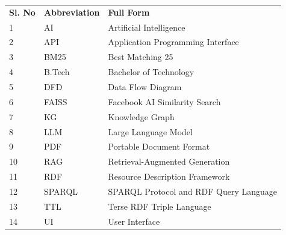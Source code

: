 \renewcommand{\arraystretch}{2.0}
\begin{tabularx}{\textwidth}{p{2cm} p{3cm} X}
\textbf{Sl. No} & \textbf{Abbreviation} & \textbf{Full Form} \\[5pt]

1 & AI & Artificial Intelligence \\[5pt]
2 & API & Application Programming Interface \\[5pt]
3 & BM25 & Best Matching 25 \\[5pt]
4 & B.Tech & Bachelor of Technology \\[5pt]
5 & DFD & Data Flow Diagram \\[5pt]
6 & FAISS & Facebook AI Similarity Search \\[5pt]
7 & KG & Knowledge Graph \\[5pt]
8 & LLM & Large Language Model \\[5pt]
9 & PDF & Portable Document Format \\[5pt]
10 & RAG & Retrieval-Augmented Generation \\[5pt]
11 & RDF & Resource Description Framework \\[5pt]
12 & SPARQL & SPARQL Protocol and RDF Query Language \\[5pt]
13 & TTL & Terse RDF Triple Language \\[5pt]
14 & UI & User Interface \\[5pt]

\end{tabularx}
